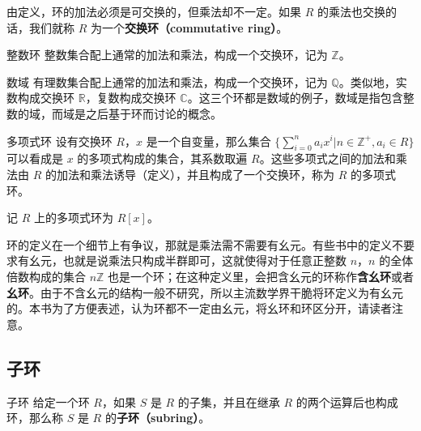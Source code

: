 由定义，环的加法必须是可交换的，但乘法却不一定。如果 $R$ 的乘法也交换的话，我们就称 $R$ 为一个\textbf{交换环（commutative ring）}。

\begin{example}{整数环}
整数集合配上通常的加法和乘法，构成一个交换环，记为 $\mathbb{Z}$。
\end{example}

\begin{example}{数域}
有理数集合配上通常的加法和乘法，构成一个交换环，记为 $\mathbb{Q}$。类似地，实数构成交换环 $\mathbb{R}$，复数构成交换环 $\mathbb{C}$。这三个环都是数域的例子，数域是指包含整数的域，而域是之后基于环而讨论的概念。
\end{example}

\begin{example}{多项式环}\label{ex_Ring_1}
设有交换环 $R$，$x$ 是一个自变量，那么集合 $\{\sum\limits_{i=0}^n a_ix^i|n\in\mathbb{Z}^+, a_i\in R\}$ 可以看成是 $x$ 的多项式构成的集合，其系数取遍 $R$。这些多项式之间的加法和乘法由 $R$ 的加法和乘法诱导（定义），并且构成了一个交换环，称为 $R$ 的多项式环。

记 $R$ 上的多项式环为 $R[x]$。
\end{example}

环的定义在一个细节上有争议，那就是乘法需不需要有幺元。有些书中的定义不要求有幺元，也就是说乘法只构成半群即可，这就使得对于任意正整数 $n$，$n$ 的全体倍数构成的集合 $n\mathbb{Z}$ 也是一个环；在这种定义里，会把含幺元的环称作\textbf{含幺环}或者\textbf{幺环}。由于不含幺元的结构一般不研究，所以主流数学界干脆将环定义为有幺元的。本书为了方便表述，认为环都不一定由幺元，将幺环和环区分开，请读者注意。

\subsection{子环}

\begin{definition}{子环}
给定一个环 $R$，如果 $S$ 是 $R$ 的子集，并且在继承 $R$ 的两个运算后也构成环，那么称 $S$ 是 $R$ 的\textbf{子环（subring）}。
\end{definition}



